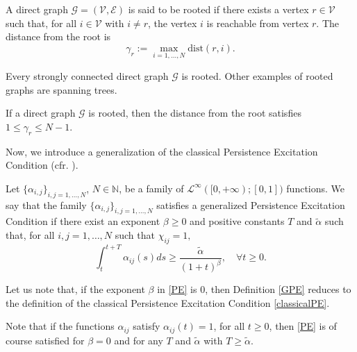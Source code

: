 \documentclass[11pt]{article}
\begin{document}
\begin{defn}\label{rooted}
	A direct graph $\mathcal{G}=(\mathcal{V},\mathcal{E})$ is said to be rooted if there exists a vertex $r\in \mathcal{V}$ such that, for all $i\in \mathcal{V}$ with $i\neq r$, the vertex $i$ is reachable from vertex $r$. The distance from the root is 
	\begin{equation}\label{gamma}
		\gamma_r:=\max_{i =1,\dots, N} \text{dist}(r,i). 
	\end{equation}
\end{defn}
\begin{ex}
	Every strongly connected direct graph $\mathcal{G}$ is rooted. Other examples of rooted graphs are spanning trees. 
\end{ex}
\begin{oss}
	If a direct graph $\mathcal{G}$ is rooted, then the distance from the root satisfies $1\leq \gamma_r\leq N-1$.
\end{oss}

\vspace{0.3cm}

Now, we introduce a generalization of the classical Persistence Excitation Condition (cfr. \cite{Bonnet,AnconaRossi,CCP}). 
\begin{defn}\label{GPE}
	Let $\{\alpha_{i,j}\}_{i,j=1,\dots,N}$, $N\in \mathbb{N}$, be a family of $\mathcal{L}^\infty([0,+\infty);[0,1])$ functions. We say that the family $\{\alpha_{i,j}\}_{i,j=1,\dots,N}$ satisfies a generalized Persistence Excitation Condition if there exist an exponent $\beta\geq 0$ and positive constants $T$ and $\tilde{\alpha}$ such that, for all $i,j=1,\dots,N$ such that $\chi_{ij}=1,$
	\begin{equation}\label{PE}
		\int_{t}^{t+T}\alpha_{ij}(s)ds\geq \frac{\tilde{\alpha}}{(1+t)^\beta},\quad \forall t\geq 0.
	\end{equation}
\end{defn}
\begin{oss}
	Let us note that, if the exponent $\beta$ in \eqref{PE} is 0, then Definition \ref{GPE} reduces to the definition of the classical Persistence Excitation Condition \eqref{classicalPE}.
\end{oss}
\begin{oss}
	Note that if the functions $\alpha_{ij}$ satisfy $\alpha_{ij}(t)=1$, for all $t\geq 0$, then \eqref{PE} is of course satisfied for $\beta=0$ and for any $T$ and $\tilde{\alpha}$ with $T\geq \tilde{\alpha}$.
\end{oss}
\end{document}

